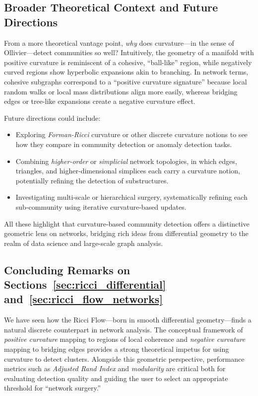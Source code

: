 \subsection{Broader Theoretical Context and Future Directions}
From a more theoretical vantage point, \emph{why} does curvature---in the sense of Ollivier---detect communities so well? Intuitively, the geometry of a manifold with positive curvature is reminiscent of a cohesive, ``ball-like'' region, while negatively curved regions show hyperbolic expansions akin to branching. In network terms, cohesive subgraphs correspond to a “positive curvature signature” because local random walks or local mass distributions align more easily, whereas bridging edges or tree-like expansions create a negative curvature effect. 

Future directions could include:
\begin{itemize}
    \item Exploring \emph{Forman-Ricci} curvature or other discrete curvature notions to see how they compare in community detection or anomaly detection tasks.
    \item Combining \emph{higher-order} or \emph{simplicial} network topologies, in which edges, triangles, and higher-dimensional simplices each carry a curvature notion, potentially refining the detection of substructures.
    \item Investigating multi-scale or hierarchical surgery, systematically refining each sub-community using iterative curvature-based updates.
\end{itemize}

All these highlight that curvature-based community detection offers a distinctive geometric lens on networks, bridging rich ideas from differential geometry to the realm of data science and large-scale graph analysis.

\subsection{Concluding Remarks on Sections~\ref{sec:ricci_differential} and~\ref{sec:ricci_flow_networks}}
We have seen how the Ricci Flow---born in smooth differential geometry---finds a natural discrete counterpart in network analysis. The conceptual framework of \emph{positive curvature} mapping to regions of local coherence and \emph{negative curvature} mapping to bridging edges provides a strong theoretical impetus for using curvature to detect clusters. Alongside this geometric perspective, performance metrics such as \emph{Adjusted Rand Index} and \emph{modularity} are critical both for evaluating detection quality and guiding the user to select an appropriate threshold for “network surgery.” 

